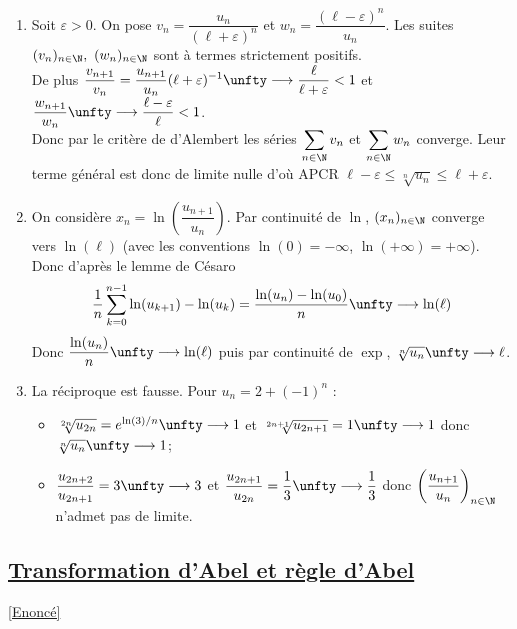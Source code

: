 \documentclass{book}
\begin{document}
\begin{enumerate}[leftmargin=*]
\begin{itemize}
			Or $\sqrt[n]{\dfrac{u_{n_0}}{A^{n_0}}}\unfty\longrightarrow 1$ donc on peut trouver $n_1\in \N$ pour lequel $\forall n\geq n_1,\ \sqrt[n]{\dfrac{u_{n_0}}{A^{n_0}}}\geq \dfrac{1}{2}$.\\
			Alors pour tout $n\geq \max(n_0,n_1)$, $\sqrt[n]{u_n}\geq \dfrac{A}{2}$.\\
			Finalement $\sqrt[n]{u_n}\unfty\longrightarrow+\infty$.
		\end{itemize}
		\item Soit $\varepsilon>0$. On pose $v_n=\dfrac{u_n}{(\ell+\varepsilon)^n}$ et $w_n=\dfrac{(\ell-\varepsilon)^n}{u_n}$. Les suites $(v_n)_{n\in \N},\ (w_n)_{n\in \N}$ sont à termes strictement positifs.\\
		De plus $\displaystyle\frac{v_{n+1}}{v_n}=\frac{u_{n+1}}{u_n}(\ell+\varepsilon)^{-1}\unfty\longrightarrow\frac{\ell}{\ell+\varepsilon}<1$ et $\displaystyle\frac{w_{n+1}}{w_n}\unfty\longrightarrow\frac{\ell-\varepsilon}{\ell}<1$.\\
		Donc par le critère de d'Alembert les séries $\displaystyle\sum_{n\in \N}v_n$ et $\displaystyle\sum_{n\in \N}w_n$ converge. Leur terme général est donc de limite nulle d'où APCR $\ell-\varepsilon\leq \sqrt[n]{u_n}\leq \ell+\varepsilon$.
		\item On considère $x_n=\ln\left(\dfrac{u_{n+1}}{u_n}\right)$. Par continuité de $\ln$, $(x_n)_{n\in \N}$ converge vers $\ln(\ell)$ (avec les conventions $\ln(0)=-\infty$, $\ln(+\infty)=+\infty$). Donc d'après le lemme de Césaro $$\frac{1}{n}\sum_{k=0}^{n-1}\ln(u_{k+1})-\ln(u_k)=\frac{\ln(u_n)-\ln(u_0)}{n}\unfty\longrightarrow\ln(\ell)$$
		Donc $\dfrac{\ln(u_n)}{n}\unfty\longrightarrow\ln(\ell)$ puis par continuité de $\exp$, $\sqrt[n]{u_n}\unfty\longrightarrow\ell$.
		\item La réciproque est fausse. Pour $u_n=2+(-1)^n$ :
		\begin{itemize}
			\item $\sqrt[2n]{u_{2n}}=e^{\ln(3)/n}\unfty\longrightarrow 1$ et $\sqrt[2n+1]{u_{2n +1}}=1\unfty\longrightarrow 1$ donc $\sqrt[n]{u_n}\unfty\longrightarrow 1$;
			\item $\dfrac{u_{2n+2}}{u_{2n+1}}=3\unfty\longrightarrow 3$ et $\dfrac{u_{2n+1}}{u_{2n}}=\dfrac{1}{3}\unfty\longrightarrow\dfrac{1}{3}$ donc $\left(\dfrac{u_{n+1}}{u_n}\right)_{n\in \N}$ n'admet pas de limite.
		\end{itemize}
	\end{enumerate}
	
	\subsection{\underline{Transformation d'Abel et règle d'Abel} }
	\label{sec:transformation-dabel-et-regle-dabel}
	\textcolor{blue}{\hyperref[Transformation et règle d'Abel]{[Enoncé]}}\\
	
\end{document}
